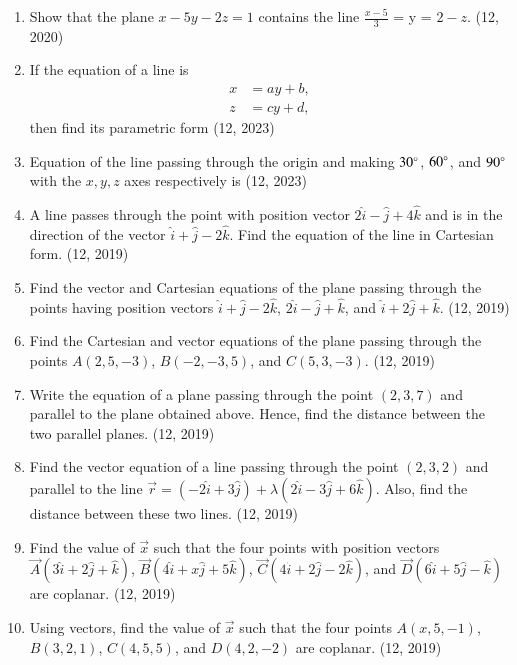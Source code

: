 \begin{enumerate}[label=\thesubsection.\arabic*, ref=\thesubsection.\theenumi]
\item Show that the plane $x - 5y - 2z = 1$ contains the line $\frac{x - 5}{3}$ = y = $2 -z$.
\hfill (12, 2020)
    \item If the equation of a line is
    \begin{align}
        x &= ay + b, \\
        z &= cy + d,
    \end{align}
    then find its parametric form
    \hfill (12, 2023)
    \item Equation of the line passing through the origin and making $30\degree$, $60\degree$, and $90\degree$ with the $x, y, z$ axes respectively is
    \hfill (12, 2023)
	\item A line passes through the point with position vector $2\hat{i} - \hat{j} + 4\hat{k}$ and is in the direction of the vector $\hat{i} + \hat{j} - 2\hat{k}$. Find the equation of the line in Cartesian form. \hfill (12, 2019)
	\item Find the vector and Cartesian equations of the plane passing through the points having position vectors $\hat{i} + \hat{j} - 2\hat{k}$, $2\hat{i} - \hat{j} + \hat{k}$, and $\hat{i} + 2\hat{j} + \hat{k}$. (12, 2019)
	\item Find the Cartesian and vector equations of the plane passing through the points $A(2, 5, -3)$, $B(-2, -3, 5)$, and $C(5, 3, -3)$. \hfill (12, 2019)
	\item Write the equation of a plane passing through the point $(2, 3, 7)$ and parallel to the plane obtained above. Hence, find the distance between the two parallel planes. \hfill (12, 2019)
	\item Find the vector equation of a line passing through the point $(2, 3, 2)$ and parallel to the line $\overrightarrow{r} = (-2\hat{i} + 3\hat{j}) + \lambda (2\hat{i} - 3\hat{j} + 6\hat{k})$. Also, find the distance between these two lines. \hfill (12, 2019)
	\item Find the value of $\vec{x}$ such that the four points with position vectors $\vec{A}(3\hat{i} + 2\hat{j} + \hat{k})$, $\vec{B}(4\hat{i} + x\hat{j} + 5\hat{k})$, $\vec{C}(4\hat{i} + 2\hat{j} - 2\hat{k})$, and $\vec{D}(6\hat{i} + 5\hat{j} - \hat{k})$ are coplanar. \hfill (12, 2019)
	\item Using vectors, find the value of $\vec{x}$ such that the four points $A(x, 5, -1)$, $B(3, 2, 1)$, $C(4, 5, 5)$, and $D(4, 2, -2)$ are coplanar. \hfill (12, 2019)

\end{enumerate}
